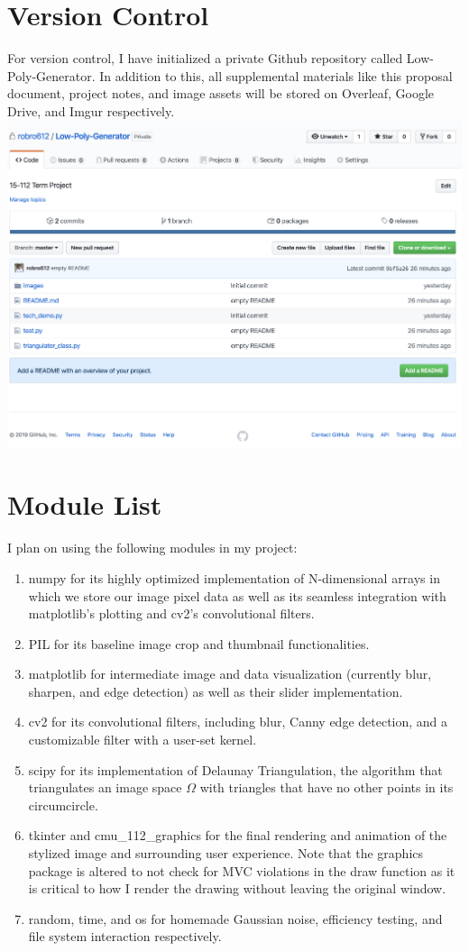\documentclass{article}
\begin{document}
\section{Version Control}
For version control, I have initialized a private Github repository called Low-Poly-Generator. In addition to this, all supplemental materials like this proposal document, project notes, and image assets will be stored on Overleaf, Google Drive, and Imgur respectively.
\\
\includegraphics[scale = 0.3]{github.png}

\section{Module List}
I plan on using the following modules in my project:
\begin{enumerate}
    \item numpy for its highly optimized implementation of N-dimensional arrays in which we store our image pixel data as well as its seamless integration with matplotlib's plotting and cv2's convolutional filters.
    \item PIL for its baseline image crop and thumbnail functionalities.
    \item matplotlib for intermediate image and data visualization (currently blur, sharpen, and edge detection) as well as their slider implementation.
    \item cv2 for its convolutional filters, including blur, Canny edge detection, and a customizable filter with a user-set kernel.
    \item scipy for its implementation of Delaunay Triangulation, the algorithm that triangulates an image space $\Omega$ with triangles that have no other points in its circumcircle.
    \item tkinter and cmu\_112\_graphics for the final rendering and animation of the stylized image and surrounding user experience. Note that the graphics package is altered to not check for MVC violations in the draw function as it is critical to how I render the drawing without leaving the original window.
    \item random, time, and os for homemade Gaussian noise, efficiency testing, and file system interaction respectively.
\end{enumerate}
\end{document}
